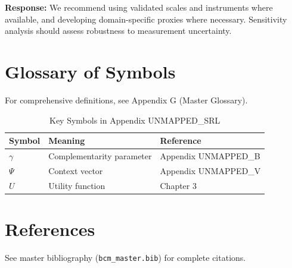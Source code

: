 \textbf{Response:} We recommend using validated scales and instruments where
available, and developing domain-specific proxies where necessary. Sensitivity
analysis should assess robustness to measurement uncertainty.



\section{Glossary of Symbols}
\label{sec:srl-glossary}

For comprehensive definitions, see Appendix G (Master Glossary).

\begin{table}[htbp]
\centering
\caption{Key Symbols in Appendix UNMAPPED_SRL}
\begin{tabular}{lll}
\toprule
\textbf{Symbol} & \textbf{Meaning} & \textbf{Reference} \\
\midrule
$\gamma$ & Complementarity parameter & Appendix UNMAPPED_B \\
$\Psi$ & Context vector & Appendix UNMAPPED_V \\
$U$ & Utility function & Chapter 3 \\
\bottomrule
\end{tabular}
\end{table}


\section{References}
\label{sec:srl-references}

See master bibliography (\texttt{bcm\_master.bib}) for complete citations.

\nocite{bcm_master}

